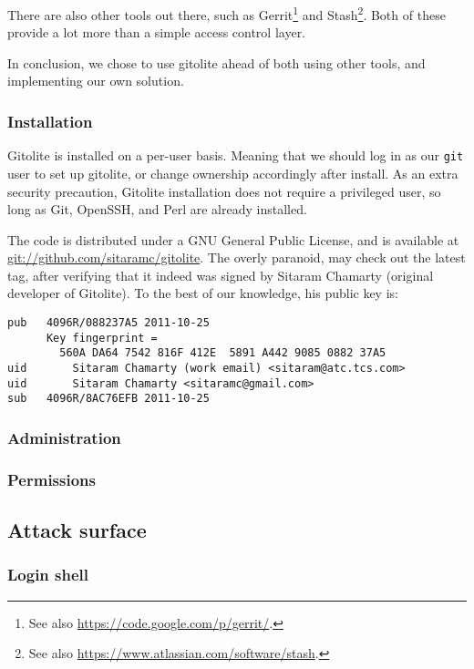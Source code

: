 There are also other tools out there, such as  Gerrit\footnote{See also
\url{https://code.google.com/p/gerrit/}.} and Stash\footnote{See also
\url{https://www.atlassian.com/software/stash}.}. Both of these provide a lot
more than a simple access control layer.

In conclusion, we chose to use gitolite ahead of both using other tools, and
implementing our own solution.

\subsubsection{Installation}

Gitolite is installed on a per-user basis. Meaning that we should log in as our
\texttt{git} user to set up gitolite, or change ownership accordingly after
install. As an extra security precaution, Gitolite installation does not
require a privileged user, so long as Git, OpenSSH, and Perl are already
installed.

The code is distributed under a GNU General Public License, and is available at
\url{git://github.com/sitaramc/gitolite}. The overly paranoid, may check out
the latest tag, after verifying that it indeed was signed by Sitaram Chamarty
(original developer of Gitolite). To the best of our knowledge, his public key
is:

\begin{verbatim}
pub   4096R/088237A5 2011-10-25
      Key fingerprint =
        560A DA64 7542 816F 412E  5891 A442 9085 0882 37A5
uid       Sitaram Chamarty (work email) <sitaram@atc.tcs.com>
uid       Sitaram Chamarty <sitaramc@gmail.com>
sub   4096R/8AC76EFB 2011-10-25
\end{verbatim}

\subsubsection{Administration}

\subsubsection{Permissions}

\subsection{Attack surface}

\subsubsection{Login shell}

